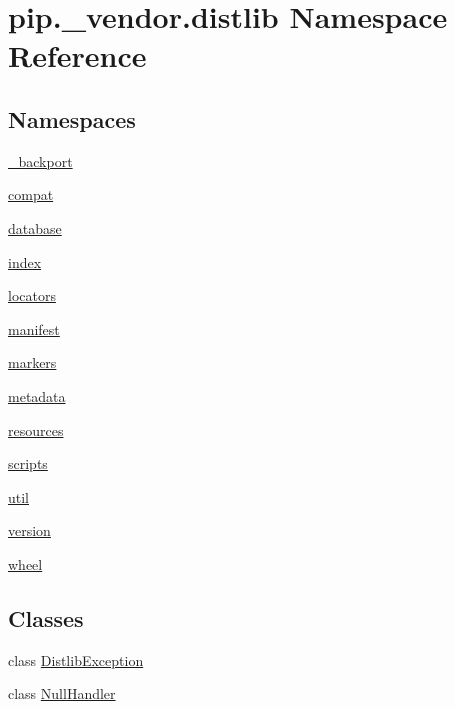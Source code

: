 \hypertarget{namespacepip_1_1__vendor_1_1distlib}{}\section{pip.\+\_\+vendor.\+distlib Namespace Reference}
\label{namespacepip_1_1__vendor_1_1distlib}
\subsection*{Namespaces}
\begin{DoxyCompactItemize}
\item 
 \hyperlink{namespacepip_1_1__vendor_1_1distlib_1_1__backport}{\+\_\+backport}
\item 
 \hyperlink{namespacepip_1_1__vendor_1_1distlib_1_1compat}{compat}
\item 
 \hyperlink{namespacepip_1_1__vendor_1_1distlib_1_1database}{database}
\item 
 \hyperlink{namespacepip_1_1__vendor_1_1distlib_1_1index}{index}
\item 
 \hyperlink{namespacepip_1_1__vendor_1_1distlib_1_1locators}{locators}
\item 
 \hyperlink{namespacepip_1_1__vendor_1_1distlib_1_1manifest}{manifest}
\item 
 \hyperlink{namespacepip_1_1__vendor_1_1distlib_1_1markers}{markers}
\item 
 \hyperlink{namespacepip_1_1__vendor_1_1distlib_1_1metadata}{metadata}
\item 
 \hyperlink{namespacepip_1_1__vendor_1_1distlib_1_1resources}{resources}
\item 
 \hyperlink{namespacepip_1_1__vendor_1_1distlib_1_1scripts}{scripts}
\item 
 \hyperlink{namespacepip_1_1__vendor_1_1distlib_1_1util}{util}
\item 
 \hyperlink{namespacepip_1_1__vendor_1_1distlib_1_1version}{version}
\item 
 \hyperlink{namespacepip_1_1__vendor_1_1distlib_1_1wheel}{wheel}
\end{DoxyCompactItemize}
\subsection*{Classes}
\begin{DoxyCompactItemize}
\item 
class \hyperlink{classpip_1_1__vendor_1_1distlib_1_1DistlibException}{Distlib\+Exception}
\item 
class \hyperlink{classpip_1_1__vendor_1_1distlib_1_1NullHandler}{Null\+Handler}
\end{DoxyCompactItemize}
